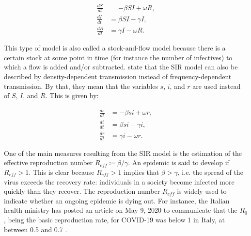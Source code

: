 \documentclass[12pt]{article}
\begin{document}
	\begin{align}
    	\frac{dS}{dt} &= -\beta SI + \omega R, \label{eq:SIR_model_S}\\
    	\frac{dI}{dt} &= \beta SI - \gamma I, \label{eq:SIR_model_I}\\
    	\frac{dR}{dt} &= \gamma I - \omega R. \label{eq:SIR_model_R}
	\end{align}
	
	This type of model is also called a stock-and-flow model because there is a certain stock at some point in time (for instance the number of infectives) to which a flow is added and/or subtracted. \textcite{keeling2011modeling} state that the SIR model can also be described by density-dependent transmission instead of frequency-dependent transmission. By that, they mean that the variables $s$, $i$, and $r$ are used instead of $S$, $I$, and $R$. This is given by:
	
	\begin{align}
    	\frac{ds}{dt} &= -\beta si + \omega r, \label{eq:SIR_model_X}\\
    	\frac{di}{dt} &= \beta si - \gamma i, \label{eq:SIR_model_Y}\\
    	\frac{dr}{dt} &= \gamma i - \omega r. \label{eq:SIR_model_Z}
	\end{align}
	
	One of the main measures resulting from the SIR model is the estimation of the effective reproduction number $R_{eff} \coloneqq \beta / \gamma$. An epidemic is said to develop if $R_{eff} > 1$. This is clear because $R_{eff} > 1$ implies that $\beta > \gamma$, i.e. the spread of the virus exceeds the recovery rate: individuals in a society become infected more quickly than they recover. The reproduction number $R_{eff}$ is widely used to indicate whether an ongoing epidemic is dying out. For instance, the Italian health ministry has posted an article on May 9, 2020 to communicate that the $R_0$, being the basic reproduction rate, for COVID-19 was below 1 in Italy, at between 0.5 and 0.7 \parencite{saluteR0}.
	
\end{document}
